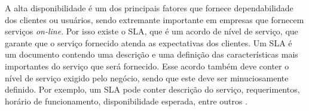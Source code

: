 A alta disponibilidade é um dos principais fatores que fornece dependabilidade dos clientes ou usuários, sendo extremante importante 
em empresas que fornecem serviços \textit{on-line}. Por isso existe o \ac{SLA}, que é um acordo de nível de serviço, que garante que 
o serviço fornecido atenda as expectativas dos clientes. Um \ac{SLA} é um documento contendo uma descrição e uma definição das 
características mais importantes do serviço que será fornecido. Esse acordo também deve conter o nível de serviço exigido pelo negócio, 
sendo que este deve ser minuciosamente definido. Por exemplo, um \ac{SLA} pode conter descrição do serviço, requerimentos, horário de 
funcionamento, disponibilidade esperada, entre outros \cite{smith2010}.
